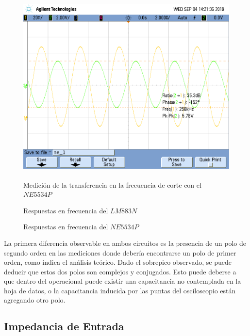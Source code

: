 \begin{figure}
\begin{center}
\includegraphics[height=10cm]{./rsc/ne_1.png}
\caption{Medición de la transferencia en la frecuencia de corte con el $NE5534P$}
\label{fig:e2_ne_fB}
\end{center}
\end{figure}

\begin{figure}
\begin{center}
\caption{Respuestas en frecuencia del $LM883N$}
\label{fig:e2_lm_bode}
\end{center}
\end{figure}

\begin{figure}
\begin{center}
\caption{Respuestas en frecuencia del $NE5534P$}
\label{fig:e2_ne_bode}
\end{center}
\end{figure}

La primera diferencia observable en ambos circuitos es la presencia de un polo de segundo orden en las mediciones donde debería encontrarse un polo de primer orden, como indica el análisis teórico. Dado el sobrepico observado, se puede deducir que estos dos polos son complejos y conjugados.
Esto puede deberse a que dentro del operacional puede existir una capacitancia no contemplada en la hoja de datos, o la capacitancia inducida por las puntas del osciloscopio están agregando otro polo.

\subsection{Impedancia de Entrada}
